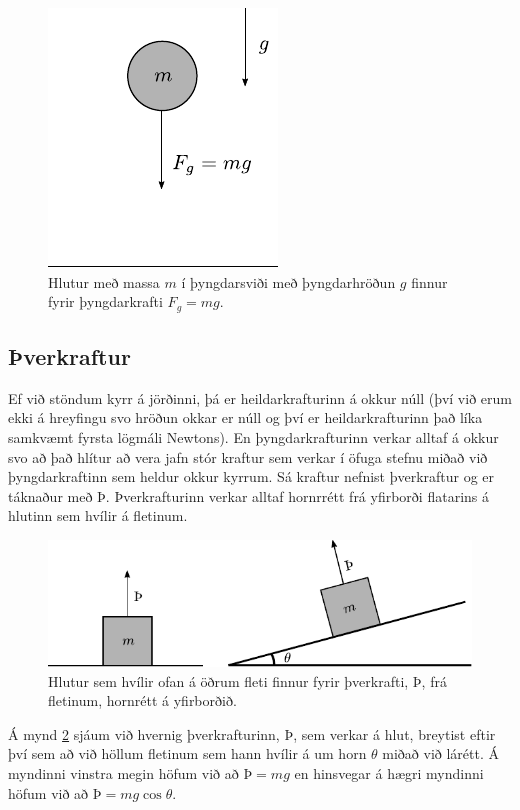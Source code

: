 \ifdefined \wholebook \else\documentclass[oneside]{book}\usepackage{EdlBook}\graphicspath{{figures/}}
\begin{document}
\begin{figure}[H]
    \centering
    \includegraphics{figures/mg.pdf}
    \caption{Hlutur með massa $m$ í þyngdarsviði með þyngdarhröðun $g$ finnur fyrir þyngdarkrafti $F_g = mg$.}
    \label{fig:stoduorka}
\end{figure}

\subsection*{Þverkraftur}

Ef við stöndum kyrr á jörðinni, þá er heildarkrafturinn á okkur núll (því við erum ekki á hreyfingu svo hröðun okkar er núll og því er heildarkrafturinn það líka samkvæmt fyrsta lögmáli Newtons). En þyngdarkrafturinn verkar alltaf á okkur svo að það hlítur að vera jafn stór kraftur sem verkar í öfuga stefnu miðað við þyngdarkraftinn sem heldur okkur kyrrum. Sá kraftur nefnist þverkraftur og er táknaður með $\text{Þ}$. Þverkrafturinn verkar alltaf hornrrétt frá yfirborði flatarins á hlutinn sem hvílir á fletinum. 

\begin{figure}[H]
    \centering
    \includegraphics{figures/thverkraftur.pdf}
    \caption{Hlutur sem hvílir ofan á öðrum fleti finnur fyrir þverkrafti, $\text{Þ}$, frá fletinum, hornrétt á yfirborðið.}
    \label{fig:normalforce}
\end{figure}

Á mynd \ref{fig:normalforce} sjáum við hvernig þverkrafturinn, $Þ$, sem verkar á hlut, breytist eftir því sem að við höllum fletinum sem hann hvílir á um horn $\theta$ miðað við lárétt. Á myndinni vinstra megin höfum við að $Þ = mg$ en hinsvegar á hægri myndinni höfum við að $Þ = mg\cos\theta$. \\
\end{document}
